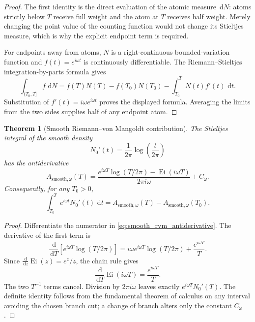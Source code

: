 \documentclass[11pt]{amsart}
\numberwithin{equation}{section}
\theoremstyle{plain}
\newtheorem{theorem}{Theorem}[section]
\theoremstyle{definition}
\theoremstyle{remark}
\DeclareMathOperator{\Ei}{Ei}
\newcommand{\1}{\mathbf{1}}
\newcommand{\dd}{\,\mathrm{d}}
\begin{document}
\begin{proof}
The first identity is the direct evaluation of the atomic measure
\(\dd N\): atoms strictly below \(T\) receive full weight and the atom at
\(T\) receives half weight.  Merely changing the point value of the
counting function would not change its Stieltjes measure, which is why the
explicit endpoint term is required.

For endpoints away from atoms, \(N\) is a right-continuous
bounded-variation function and \(f(t)=e^{i\omega t}\) is continuously
differentiable.  The Riemann--Stieltjes integration-by-parts formula gives
\begin{equation}
\int_{(T_0,T]} f\,\dd N
=
f(T)N(T)-f(T_0)N(T_0)-\int_{T_0}^{T}N(t)f'(t)\,\dd t.
\label{eq:stieltjes_general_ibp}
\end{equation}
Substitution of \(f'(t)=i\omega e^{i\omega t}\) proves the displayed
formula.  Averaging the limits from the two sides supplies half of any
endpoint atom.
\end{proof}

\begin{theorem}[Smooth Riemann--von Mangoldt contribution]
\label{thm:smooth_rvm_contribution}
The Stieltjes integral of the smooth density
\begin{equation}
N_0'(t)
=
\frac1{2\pi}\log\!\left(\frac{t}{2\pi}\right)
\label{eq:N0_derivative}
\end{equation}
has the antiderivative
\begin{equation}
\boxed{
A_{\mathrm{smooth},\omega}(T)
=
\frac{
 e^{i\omega T}\log(T/2\pi)-\Ei(i\omega T)
}{2\pi i\omega}
+C_\omega.
}
\label{eq:smooth_rvm_antiderivative}
\end{equation}
Consequently, for any \(T_0>0\),
\begin{equation}
\int_{T_0}^{T}e^{i\omega t}N_0'(t)\,\dd t
=
A_{\mathrm{smooth},\omega}(T)
-
A_{\mathrm{smooth},\omega}(T_0).
\label{eq:smooth_rvm_definite}
\end{equation}
\end{theorem}

\begin{proof}
Differentiate the numerator in \eqref{eq:smooth_rvm_antiderivative}.
The derivative of the first term is
\begin{equation}
\frac{\dd}{\dd T}
\left[e^{i\omega T}\log(T/2\pi)\right]
=
i\omega e^{i\omega T}\log(T/2\pi)
+
\frac{e^{i\omega T}}{T}.
\label{eq:smooth_derivative_first}
\end{equation}
Since \(\frac{\dd}{\dd z}\Ei(z)=e^z/z\), the chain rule gives
\begin{equation}
\frac{\dd}{\dd T}\Ei(i\omega T)
=
\frac{e^{i\omega T}}{T}.
\label{eq:smooth_derivative_Ei}
\end{equation}
The two \(T^{-1}\) terms cancel.  Division by \(2\pi i\omega\)
leaves exactly \(e^{i\omega T}N_0'(T)\).  The definite identity follows
from the fundamental theorem of calculus on any interval avoiding the
chosen branch cut; a change of branch alters only the constant
\(C_\omega\).
\end{proof}
\end{document}
